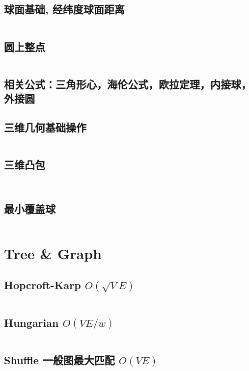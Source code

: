 \documentclass[titlepage, a4paper]{article}
\begin{document}
\begin{multicols}{2}
\begin{spacing}{0.6}
				\subsection{球面基础, 经纬度球面距离}
				\begin{small}
					
				\end{small}
					\inputminted{cpp}{src/Geometry/经纬度求球面最短距离.cpp}
	
				\subsection{圆上整点}
					\inputminted{cpp}{src/Geometry/圆上整点.cpp}
				\subsection{相关公式：三角形心，海伦公式，欧拉定理，内接球，外接圆}
					
				\subsection{三维几何基础操作}
					\inputminted{cpp}{src/Geometry/三维几何.cpp}
				\subsection{三维凸包}
					\inputminted{cpp}{src/Geometry/三维凸包.cpp}
					\inputminted{cpp}{src/Geometry/Convex3D_wrap.cpp}
				\subsection{最小覆盖球}
					\inputminted{cpp}{src/Geometry/最小覆盖球.cpp}
					
			\section{Tree \& Graph}
				\subsection{Hopcroft-Karp $O(\sqrt{V} E)$}
					\inputminted[highlightlines={5,9}]{cpp}{src/TreeandGraph/hk_skip2004.cpp}
				\subsection{Hungarian $O(V E / w)$}
					\inputminted{cpp}{src/TreeandGraph/Hungarian.cpp}
				\subsection{Shuffle 一般图最大匹配 $O(V E)$}
					\inputminted{cpp}{src/TreeandGraph/一般图最大匹配-shuffle.cpp}

\end{spacing}
\end{multicols}
\end{document}
